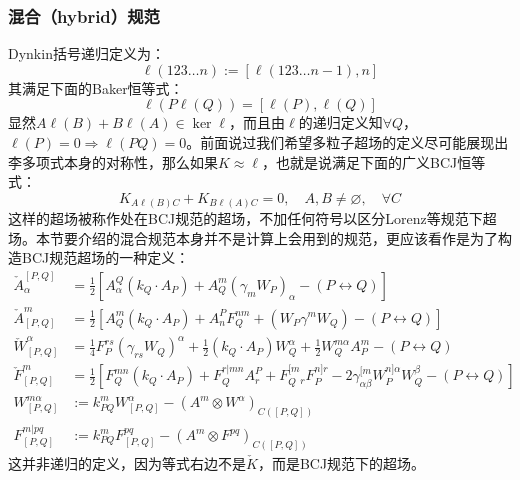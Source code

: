 \subsubsection{混合（hybrid）规范}
Dynkin括号递归定义为：
\begin{equation}
	\ell(123\ldots n):=[\ell(123\ldots n-1),n]
\end{equation}
其满足下面的Baker恒等式：
\begin{equation}
	\ell(P\ell(Q))=[\ell(P),\ell(Q)]
\end{equation}
显然$A\ell(B)+B\ell(A)\in\ker\ell$，而且由$\ell$的递归定义知$\forall Q$，$\ell(P) = 0\Rightarrow \ell(PQ)=0$。前面说过我们希望多粒子超场的定义尽可能展现出李多项式本身的对称性，那么如果$K\approx \ell$，也就是说满足下面的广义BCJ恒等式：
\begin{equation}
	\label{eq:6.38}
	K_{A\ell(B)C}+K_{B\ell(A)C}=0,\quad A,B\neq\varnothing,\quad\forall C
\end{equation}
这样的超场被称作处在BCJ规范的超场，不加任何符号以区分Lorenz等规范下超场。本节要介绍的混合规范本身并不是计算上会用到的规范，更应该看作是为了构造BCJ规范超场的一种定义：
\begin{equation}
	\begin{aligned}
		\check{A}_\alpha^{[P,  {Q}]}&=\frac{1}{2}[A_\alpha^  {Q}(k_Q\cdot A_P)+A_Q^m(\gamma_mW_P)_\alpha-(P\leftrightarrow Q)]
		\\\check{A}_{[P,  {Q}]}^m&=\frac{1}{2}[A_Q^m(k_Q\cdot A_P)+A_n^PF_Q^{nm}+(W_P\gamma^mW_Q)-(P\leftrightarrow Q)]\\
		\check{W}_{[P,  {Q}]}^\alpha&=\frac{1}{4}F_P^{rs}(\gamma_{rs}W_Q)^\alpha+\frac{1}{2}(k_Q\cdot A_P)W_Q^\alpha+\frac{1}{2}W_Q^{m\alpha}A_P^m-(P\leftrightarrow Q)\\
		\check{F}_{[P,  {Q}]}^m&=\frac{1}{2}{\left[F_Q^{mn}(k_Q\cdot A_P)+F_Q^{r|mn}A_r^P+F_Q^{[m}{}_rF_P^{n]r}-2\gamma_{\alpha\beta}^{[m}W_P^{n]\alpha}W_Q^\beta-(P\leftrightarrow Q)\right]}\\
		W_{[P,Q]}^{m\alpha}&:=k_{PQ}^mW_{[P,Q]}^\alpha-(A^m\otimes W^\alpha)_{C([P,Q])}\\
		F_{[P,Q]}^{m|pq}&:=k_{PQ}^mF_{[P,Q]}^{pq}-(A^m\otimes F^{pq})_{C([P,Q])}
	\end{aligned}
\end{equation}
这并非递归的定义，因为等式右边不是$\check K$，而是BCJ规范下的超场。
